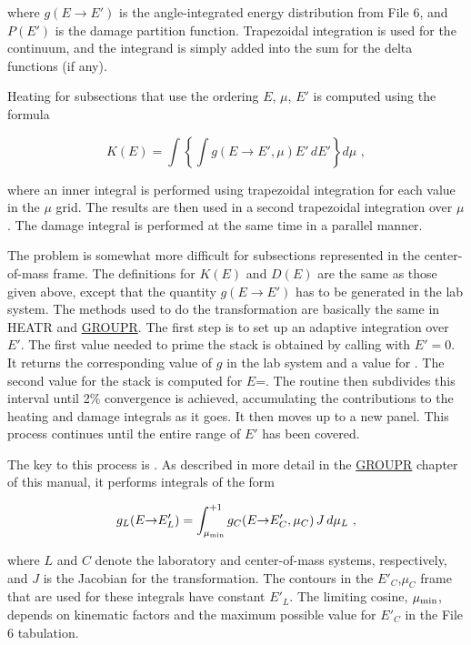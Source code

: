 \noindent
where $g(E{\rightarrow}E')$ is the angle-integrated energy
distribution from File 6, and $P(E')$ is the damage partition
function.  Trapezoidal integration is used for the continuum,
and the integrand is simply added into the sum for the
delta functions (if any).

Heating for subsections that use the ordering $E$, $\mu$, $E'$
is computed using the formula

\begin{equation}
   K(E)=\int \left\{ \int g(E{\rightarrow}E',\mu)
     E'\,dE'\right\} d\mu\,\,,
\label{llnl}
\end{equation}

\noindent
where an inner integral is performed using trapezoidal
integration for each value in the $\mu$ grid.  The results
are then used in a second trapezoidal integration over $\mu$.
The damage integral is performed at the same time in a
parallel manner.

The problem is somewhat more difficult for subsections
represented in the center-of-mass frame.  The definitions
for $K(E)$ and $D(E)$ are the same as those given above,
except that the quantity $g(E{\rightarrow}E')$ has to be
generated in the lab system.  The methods used to do the
transformation are basically the same in HEATR and
\hyperlink{sGROUPRhy}{GROUPR}.  The
first step is to set up an adaptive
integration over $E'$.  The first value needed to prime the
stack is obtained by calling  with $E'{=}0$.  It
returns the corresponding value of $g$ in the lab system and
a value for .  The second value for the stack is
computed for $E$=.  The routine then subdivides
this interval until 2\% convergence is achieved, accumulating
the contributions to the heating and damage integrals as it
goes.  It then moves up to a new panel.  This process
continues until the entire range of $E'$ has been covered.

The key to this process is .
As described in more detail in the
\hyperlink{sGROUPRhy}{GROUPR} chapter
of this manual, it performs integrals of the form

\begin{equation}
   g_L(E{\rightarrow}E'_L)=\int_{\mu_{\rm min}}^{+1}
      g_C(E{\rightarrow}E'_C,\mu_C)\,J\,d\mu_L\,\,,
\label{transCM}
\end{equation}

\noindent
where $L$ and $C$ denote the laboratory and center-of-mass
systems, respectively, and $J$ is the Jacobian for the
transformation.  The contours in the $E'_C$,$\mu_C$ frame that
are used for these integrals have constant $E'_L$.  The
limiting cosine, $\mu_{\rm min}$, depends on kinematic factors
and the maximum possible value for $E'_C$ in the File 6
tabulation.

